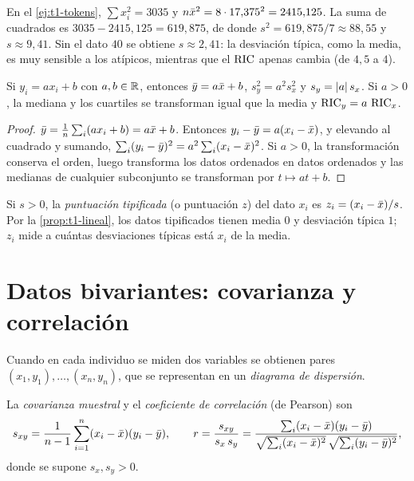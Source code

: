\begin{ejemplo}\label{ej:t1-varianza}
En el \cref{ej:t1-tokens}, $\sum x_i^{2}=3035$ y $n\bar{x}^{2}=8\cdot 17{,}375^{2}=2415{,}125$. La suma de cuadrados es $3035-2415{,}125=619{,}875$, de donde $s^{2}=619{,}875/7\approx 88{,}55$ y $s\approx 9{,}41$. Sin el dato $40$ se obtiene $s\approx 2{,}41$: la desviación típica, como la media, es muy sensible a los atípicos, mientras que el $\operatorname{RIC}$ apenas cambia (de $4{,}5$ a $4$).
\end{ejemplo}

\begin{proposicion}\label{prop:t1-lineal}
Si $y_i=ax_i+b$ con $a,b\in\mathbb{R}$, entonces $\bar{y}=a\bar{x}+b$, $s_y^{2}=a^{2}s_x^{2}$ y $s_y=\lvert a\rvert\,s_x$. Si $a>0$, la mediana y los cuartiles se transforman igual que la media y $\operatorname{RIC}_y=a\,\operatorname{RIC}_x$.
\end{proposicion}

\begin{proof}
$\bar{y}=\frac1n\sum_i(ax_i+b)=a\bar{x}+b$. Entonces $y_i-\bar{y}=a(x_i-\bar{x})$, y elevando al cuadrado y sumando, $\sum_i(y_i-\bar{y})^{2}=a^{2}\sum_i(x_i-\bar{x})^{2}$. Si $a>0$, la transformación conserva el orden, luego transforma los datos ordenados en datos ordenados y las medianas de cualquier subconjunto se transforman por $t\mapsto at+b$.
\end{proof}

\begin{definicion}[Tipificación]\label{def:t1-z}
Si $s>0$, la \emph{puntuación tipificada} (o puntuación $z$) del dato $x_i$ es $z_i=(x_i-\bar{x})/s$. Por la \cref{prop:t1-lineal}, los datos tipificados tienen media $0$ y desviación típica $1$; $z_i$ mide a cuántas desviaciones típicas está $x_i$ de la media.
\end{definicion}

\section{Datos bivariantes: covarianza y correlación}

Cuando en cada individuo se miden dos variables se obtienen pares $(x_1,y_1),\dots,(x_n,y_n)$, que se representan en un \emph{diagrama de dispersión}.

\begin{definicion}\label{def:t1-cov}
La \emph{covarianza muestral} y el \emph{coeficiente de correlación} (de Pearson) son
\[
s_{xy}=\frac{1}{n-1}\sum_{i=1}^{n}(x_i-\bar{x})(y_i-\bar{y}),
\qquad
r=\frac{s_{xy}}{s_x\,s_y}=\frac{\sum_i(x_i-\bar{x})(y_i-\bar{y})}{\sqrt{\sum_i(x_i-\bar{x})^{2}}\,\sqrt{\sum_i(y_i-\bar{y})^{2}}},
\]
donde se supone $s_x,s_y>0$.
\end{definicion}

